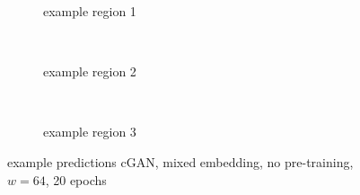 \begin{figure}[p] %
    \begin{subfigure}{\textwidth}
        \centering
        \caption{example  region 1} \label{fig:results:cGAN64_mixed_r1}
    \end{subfigure}\\[3mm]
    \begin{subfigure}{\textwidth}
        \centering
        \caption{example region 2} \label{fig:results:cGAN64_mixed_r2}
    \end{subfigure}\\[3mm]
    \begin{subfigure}{\textwidth}
        \centering
        \caption{example region 3} \label{fig:results:cGAN64_mixed_r3}
    \end{subfigure}
    \caption{example predictions cGAN, mixed embedding, no pre-training, $w=64$, 20 epochs} 
     \label{fig:results:GAN64_mixed_matrices}
\end{figure}


